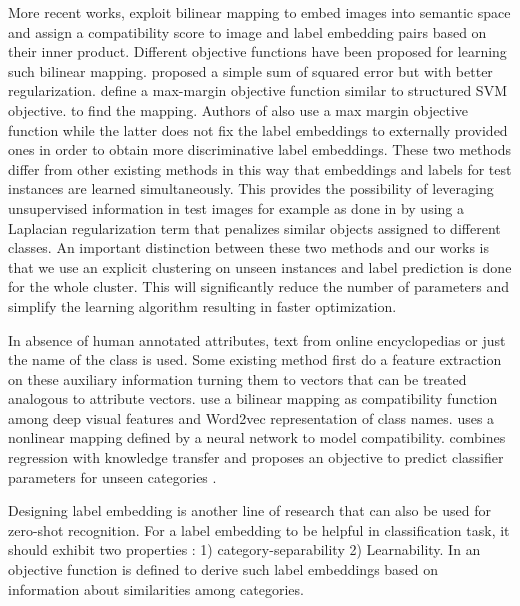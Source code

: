 \documentclass[wcp]{jmlr}
\begin{document}

More recent works, exploit bilinear mapping to embed images into semantic space and assign a compatibility score to image and label embedding
 pairs based on their inner product. Different objective functions have been proposed for learning such bilinear mapping. \cite{emb15}
 proposed a simple sum of squared error but with better regularization.
\cite{li15max} define a max-margin objective function similar to structured SVM objective.
 to find the mapping. Authors of \cite{li15max, semi15} also use a max margin objective function
while the latter does not fix the label embeddings to externally provided ones in order to obtain more discriminative label embeddings. These two methods
differ from other existing methods in this way that embeddings and labels for test instances are learned simultaneously. This provides the possibility of
leveraging unsupervised information in test images for example as done in \cite{semi15} by using a Laplacian regularization term that penalizes
 similar objects assigned to different classes.
 An important distinction between these two methods and our works is that we use an explicit clustering on unseen instances
 and label prediction is done for the whole cluster. This will significantly reduce the number of parameters
 and simplify the learning algorithm resulting in faster optimization.

 In absence of human annotated attributes, text from online encyclopedias or just the name of the class is used. Some existing method
 first do a feature extraction on these auxiliary information turning them to vectors that can be treated analogous to attribute vectors.
 \cite{devise} use a bilinear mapping as compatibility function among deep visual features and Word2vec \cite{word2vec} representation of
 class names. \cite{ba2015} uses a nonlinear mapping defined by a neural network to model compatibility. \cite{mohamed13} combines regression with knowledge transfer and proposes an objective to predict classifier parameters
 for unseen categories .

 Designing label embedding is another line of research that can also be used for zero-shot recognition. For a label embedding to be helpful in classification task,
 it should exhibit two properties \cite{Yu2013}: 1) category-separability 2) Learnability. In \cite{Yu2013} an objective function is defined to derive
 such label embeddings based on information about similarities among categories.
\end{document}
